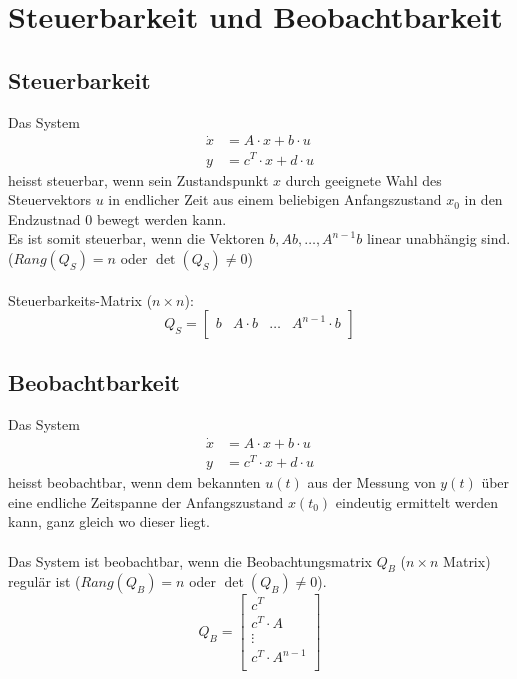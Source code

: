 



\section{Steuerbarkeit und Beobachtbarkeit}
\subsection{Steuerbarkeit}
Das System 
\[\begin{aligned}
	\dot{x} &= A \cdot x + b \cdot u \\
	y &= c^T \cdot x + d \cdot u
\end{aligned}\]
heisst steuerbar, wenn sein Zustandspunkt $x$ durch geeignete Wahl des Steuervektors $u$ in endlicher Zeit aus einem beliebigen Anfangszustand $x_0$ in den Endzustnad $0$ bewegt werden kann.\\
Es ist somit steuerbar, wenn die Vektoren $b, Ab, \ldots, A^{n-1}b$ linear unabhängig sind. ($Rang(Q_S) = n$ oder $\det(Q_S)\neq 0$)\\\\
Steuerbarkeits-Matrix ($n\times n$):
\[
	Q_S = 
	\begin{bmatrix}
			b	&	A\cdot b	& \ldots & A^{n-1} \cdot b\\
	\end{bmatrix} 
\]

\subsection{Beobachtbarkeit}
Das System 
\[\begin{aligned}
	\dot{x} &= A \cdot x + b \cdot u \\
	y &= c^T \cdot x + d \cdot u
\end{aligned}\]
heisst beobachtbar, wenn dem bekannten $u(t)$ aus der Messung von $y(t)$ über eine endliche Zeitspanne der Anfangszustand $x(t_0)$ eindeutig ermittelt werden kann, ganz gleich wo dieser liegt.\\
\\
Das System ist beobachtbar, wenn die Beobachtungsmatrix $Q_B$ ($n\times n$ Matrix) regulär ist ($Rang(Q_B) = n$ oder $\det(Q_B)\neq 0$).
\[
	Q_B=
	\begin{bmatrix}
		c^T\\
		c^T \cdot A\\
		\vdots\\
		c^T\cdot A^{n-1}\\
	\end{bmatrix}
\]